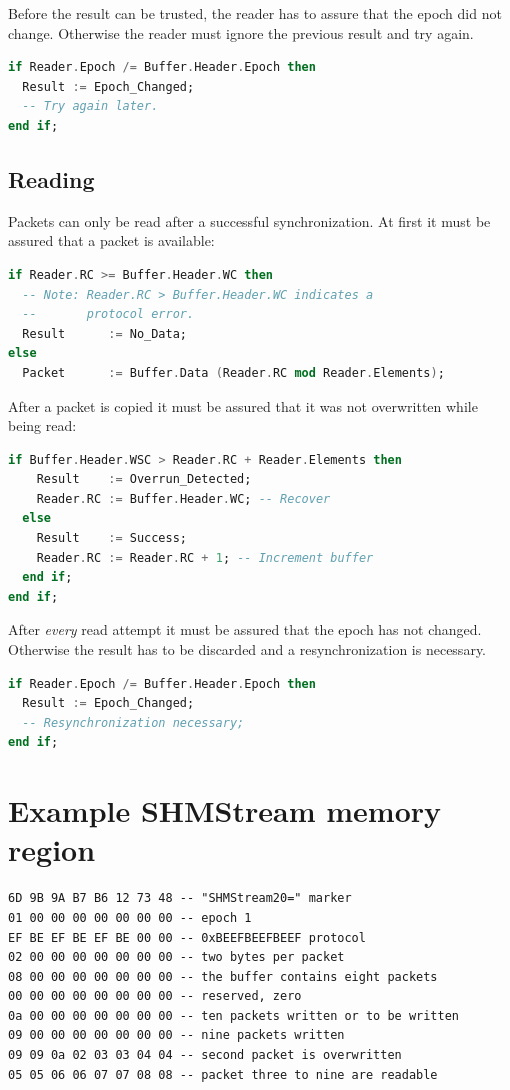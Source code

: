 \documentclass[a4paper,twoside,titlepage]{article}
\begin{document}
Before the result can be trusted, the reader has to assure that the epoch did
not change. Otherwise the reader must ignore the previous result and try again.

\begin{lstlisting}[firstnumber=last,language=Ada]
if Reader.Epoch /= Buffer.Header.Epoch then
  Result := Epoch_Changed;
  -- Try again later.
end if;
\end{lstlisting}

\subsection{Reading}

Packets can only be read after a successful synchronization.
At first it must be assured that a packet is available:

\begin{lstlisting}[language=Ada]
if Reader.RC >= Buffer.Header.WC then
  -- Note: Reader.RC > Buffer.Header.WC indicates a
  --       protocol error.
  Result      := No_Data;
else
  Packet      := Buffer.Data (Reader.RC mod Reader.Elements);
\end{lstlisting}

After a packet is copied it must be assured that it was not overwritten while being read:

\begin{lstlisting}[firstnumber=last,language=Ada]
  if Buffer.Header.WSC > Reader.RC + Reader.Elements then
    Result    := Overrun_Detected;
    Reader.RC := Buffer.Header.WC; -- Recover
  else
    Result    := Success;
    Reader.RC := Reader.RC + 1; -- Increment buffer
  end if;
end if;
\end{lstlisting}

After \emph{every} read attempt it must be assured that the epoch has not changed.
Otherwise the result has to be discarded and a resynchronization is necessary.

\begin{lstlisting}[firstnumber=last,language=Ada]
if Reader.Epoch /= Buffer.Header.Epoch then
  Result := Epoch_Changed;
  -- Resynchronization necessary;
end if;
\end{lstlisting}

\newpage
\appendix
\section{Example SHMStream memory region}
\begin{verbatim}
6D 9B 9A B7 B6 12 73 48 -- "SHMStream20=" marker
01 00 00 00 00 00 00 00 -- epoch 1
EF BE EF BE EF BE 00 00 -- 0xBEEFBEEFBEEF protocol
02 00 00 00 00 00 00 00 -- two bytes per packet
08 00 00 00 00 00 00 00 -- the buffer contains eight packets
00 00 00 00 00 00 00 00 -- reserved, zero
0a 00 00 00 00 00 00 00 -- ten packets written or to be written
09 00 00 00 00 00 00 00 -- nine packets written
09 09 0a 02 03 03 04 04 -- second packet is overwritten
05 05 06 06 07 07 08 08 -- packet three to nine are readable
\end{verbatim}
\end{document}
